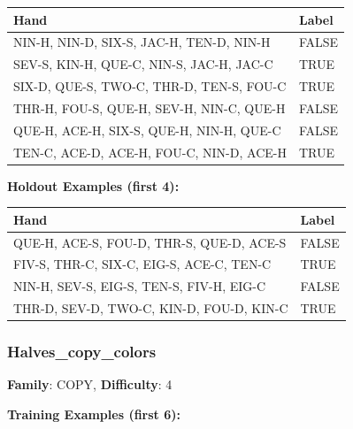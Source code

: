 \documentclass[10pt,a4paper]{article}
\begin{document}
\begin{small}
\begin{tabular}{p{8cm}l}
\toprule
Hand & Label \\
\midrule
NIN-H, NIN-D, SIX-S, JAC-H, TEN-D, NIN-H & \textcolor{negative}{FALSE} \\
SEV-S, KIN-H, QUE-C, NIN-S, JAC-H, JAC-C & \textcolor{positive}{TRUE} \\
SIX-D, QUE-S, TWO-C, THR-D, TEN-S, FOU-C & \textcolor{positive}{TRUE} \\
THR-H, FOU-S, QUE-H, SEV-H, NIN-C, QUE-H & \textcolor{negative}{FALSE} \\
QUE-H, ACE-H, SIX-S, QUE-H, NIN-H, QUE-C & \textcolor{negative}{FALSE} \\
TEN-C, ACE-D, ACE-H, FOU-C, NIN-D, ACE-H & \textcolor{positive}{TRUE} \\
\bottomrule
\end{tabular}
\end{small}

\textbf{Holdout Examples (first 4):}

\begin{small}
\begin{tabular}{p{8cm}l}
\toprule
Hand & Label \\
\midrule
QUE-H, ACE-S, FOU-D, THR-S, QUE-D, ACE-S & \textcolor{negative}{FALSE} \\
FIV-S, THR-C, SIX-C, EIG-S, ACE-C, TEN-C & \textcolor{positive}{TRUE} \\
NIN-H, SEV-S, EIG-S, TEN-S, FIV-H, EIG-C & \textcolor{negative}{FALSE} \\
THR-D, SEV-D, TWO-C, KIN-D, FOU-D, KIN-C & \textcolor{positive}{TRUE} \\
\bottomrule
\end{tabular}
\end{small}

\vspace{0.5cm}

\subsubsection{Halves\_copy\_colors}

\textbf{Family}: COPY, \textbf{Difficulty}: 4

\textbf{Training Examples (first 6):}
\end{document}
